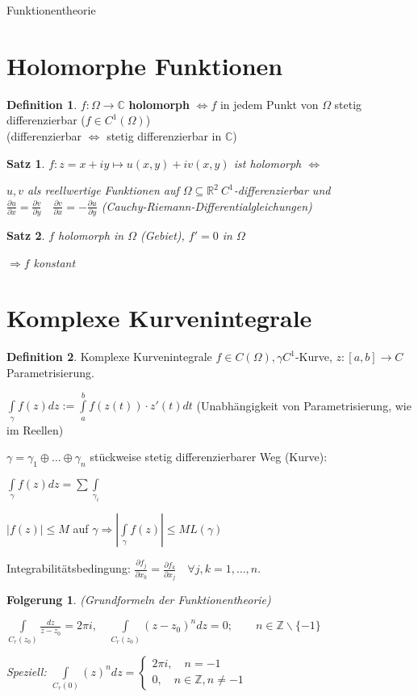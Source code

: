 \documentclass[ngerman,halfparskip]{scrartcl}
\newtheorem*{satz}{Satz}
\newtheorem*{folg}{Folgerung}
\theoremstyle{definition}
\newtheorem*{defin}{Definition}
\def\R{\mathbb R}
\def\C{\mathbb C}
\begin{document}
\huge Funktionentheorie \normalsize
\section{Holomorphe Funktionen}
\begin{defin}
$f:\Omega \to \C$ \textbf{holomorph} $\Leftrightarrow f$ in jedem Punkt von $\Omega$ stetig differenzierbar ($f\in C^1(\Omega)$)\\(differenzierbar $\Leftrightarrow$ stetig differenzierbar in $\C$)
\end{defin}

\begin{satz}
$f: z= x+iy\mapsto u(x,y)+iv(x,y)$ ist holomorph $\Leftrightarrow$

$u,v$ als reellwertige Funktionen auf $\Omega\subseteq \R^2 ~ C^1$-differenzierbar und $\frac{\partial u}{\partial x}=\frac{\partial v}{\partial y}\quad \frac{\partial v}{\partial x}=-\frac{\partial u}{\partial y}$ (Cauchy-Riemann-Differentialgleichungen)

\end{satz}

\begin{satz} $f$ holomorph in $\Omega$ (Gebiet), $f'=0$ in $\Omega$

$\Rightarrow f$ konstant
\end{satz}

\section*{Komplexe Kurvenintegrale}
\begin{defin}{Komplexe Kurvenintegrale} $f\in C(\Omega), \gamma C^1$-Kurve, $z:[a,b]\rightarrow C$ Parametrisierung.

$\int\limits_\gamma f(z)dz:=\int\limits_a^bf(z(t))\cdot z'(t)dt$ (Unabhängigkeit von Parametrisierung, wie im Reellen)

$\gamma= \gamma_1\oplus \ldots \oplus \gamma_n$ stückweise stetig differenzierbarer Weg (Kurve):

$\int\limits_\gamma f(z)dz=\sum\int\limits_{\gamma_i}$
\end{defin}

$|f(z)|\leq M$ auf $\gamma \Rightarrow |\int\limits_\gamma f(z)|\leq M L(\gamma)$

Integrabilitätsbedingung: $\frac{\partial f_j}{\partial x_k}=\frac{\partial f_k}{\partial x_j} \quad \forall j,k=1,\ldots, n$. 

\begin{folg} (Grundformeln der Funktionentheorie) 

$\int\limits_{C_r(z_0)}\frac{dz}{z-z_0}=2\pi i, \quad \int\limits_{C_r(z_0)}(z-z_0)^ndz=0; \qquad n\in\mathbb Z \backslash \{-1\}$

Speziell: $\int\limits_{C_r(0)}(z)^ndz=\begin{cases}2\pi i, \quad n=-1 \\ 0, \quad n\in \mathbb Z, n\neq -1\end{cases}$
\end{folg}
\end{document}
